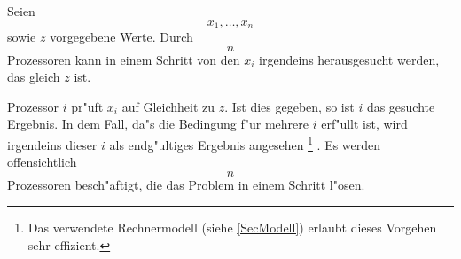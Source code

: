 \begin{satz}
\label{SatzAlgSucheGleich}
    Seien \[ x_1, \ldots , x_n \] sowie $z$ vorgegebene Werte.
    Durch \[ n \] Prozessoren kann in einem Schritt von den $x_i$
    irgendeins herausgesucht werden, das gleich $z$ ist.
\end{satz}
\begin{beweis}
    Prozessor $i$ pr"uft $x_i$ auf Gleichheit zu $z$. Ist dies gegeben,
    so ist $i$ das gesuchte Ergebnis. In dem Fall, da"s die Bedingung f"ur
    mehrere $i$ erf"ullt ist, wird irgendeins dieser $i$ als endg"ultiges
    Ergebnis angesehen \footnote{Das verwendete Rechnermodell (siehe
    \ref{SecModell}) erlaubt dieses Vorgehen sehr effizient.} .
    Es werden offensichtlich \[ n \] Prozessoren besch"aftigt, die das 
    Problem in einem Schritt l"osen.
\end{beweis}

